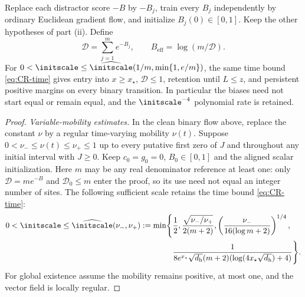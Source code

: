 \begin{corollary}
\label{cor:CR-independent}
Replace each distractor score $-B$ by $-B_j$, train every $B_j$ independently by ordinary Euclidean gradient flow,
and initialize $B_j(0)\in[0,1]$. Keep the other hypotheses of part (ii).
Define
\[
 \mathcal D=\sum_{j=1}^m e^{-B_j},\qquad B_{\mathrm{eff}}=\log(m/\mathcal D).
\]
For $0<\initscale\le\widehat\initscale(1/m,\min\{1,e/m\})$, the same time bound \cref{eq:CR-time} gives
entry into $x\ge x_\star$, $\mathcal D\le1$, retention until $L\le z$, and persistent positive margins on every binary transition.
In particular the biases need not start equal or remain equal, and the $\initscale^{-4}$ polynomial rate is retained.
\end{corollary}
\begin{proof}
\emph{Variable-mobility estimates.}
In the clean binary flow above, replace the constant $\nu$ by a regular time-varying mobility $\nu(t)$.
Suppose $0<\nu_-\le\nu(t)\le\nu_+\le1$ up to every putative first zero of $J$ and throughout any initial interval with $J\ge0$.
Keep $c_0=g_0=0$, $B_0\in[0,1]$ and the aligned scalar initialization.
Here $m$ may be any real denominator reference at least one: only $\mathcal D=me^{-B}$ and $\mathcal D_0\le m$ enter the proof,
so its use need not equal an integer number of sites.
The following sufficient scale retains the time bound \cref{eq:CR-time}:
\begin{equation}
 \begin{aligned}
 0<\initscale\le\widehat\initscale(\nu_-,\nu_+):=\min\Biggl\{&\frac12,
 \frac{\sqrt{\nu_-/\nu_+}}{2(m+2)},
 \left(\frac{\nu_-}{16(\log m+2)}\right)^{1/4},\\
 &\frac1{8e^{x_\star}\sqrt{d_{\mathrm h}}(m+2)(\log(4x_\star\sqrt{d_{\mathrm h}})+4)}\Biggr\}.
 \end{aligned}
 \label{eq:CR-variable-scale}
\end{equation}
For global existence assume the mobility remains positive, at most one, and the vector field is locally regular.


\end{proof}
